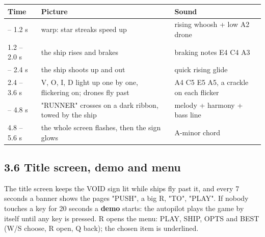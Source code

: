 \documentclass[11pt,a4paper]{article}
\begin{document}
\par\noindent\begin{minipage}{\linewidth}\centering\small
\begin{tabular}{|>{\raggedright\arraybackslash}p{2.39cm}|>{\raggedright\arraybackslash}p{7.65cm}|>{\raggedright\arraybackslash}p{6.21cm}|}
\hline\rowcolor{accent}\textbf{\color{white}Time} & \textbf{\color{white}Picture} & \textbf{\color{white}Sound}\\\hline
0.0 – 1.2 s & warp: star streaks speed up & rising whoosh + low A2 drone\\\hline
\rowcolor{rowshade}1.2 – 2.0 s & the ship rises and brakes & braking notes E4 C4 A3\\\hline
2.0 – 2.4 s & the ship shoots up and out & quick rising glide\\\hline
\rowcolor{rowshade}2.4 – 3.6 s & V, O, I, D light up one by one, flickering on; drones fly past & A4 C5 E5 A5, a crackle on each flicker\\\hline
3.6 – 4.8 s & "RUNNER" crosses on a dark ribbon, towed by the ship & melody + harmony + bass line\\\hline
\rowcolor{rowshade}4.8 – 5.6 s & the whole screen flashes, then the sign glows & A-minor chord\\\hline
\end{tabular}
\end{minipage}\par\medskip

\subsection*{3.6 Title screen, demo and menu}
The title screen keeps the VOID sign lit while ships fly past it, and every 7 seconds a banner shows the pages "PUSH", a big R, "TO", "PLAY". If nobody touches a key for 20 seconds a \textbf{demo} starts: the autopilot plays the game by itself until any key is pressed. R opens the menu: PLAY, SHIP, OPTS and BEST (W/S choose, R open, Q back); the chosen item is underlined.
\end{document}

